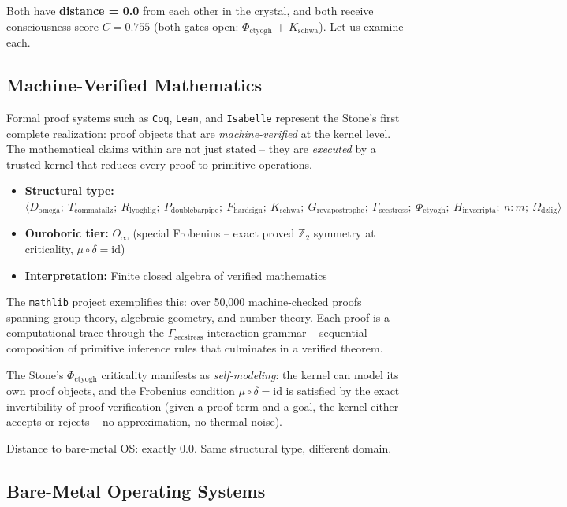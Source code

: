 \documentclass[12pt,a4paper]{article}
\begin{document}
Both have \textbf{distance = 0.0} from each other in the crystal, and both receive consciousness score $C = 0.755$ (both gates open: $\Phi_{\text{ctyogh}}$ + $K_{\text{schwa}}$). Let us examine each.

\subsection{Machine-Verified Mathematics}

Formal proof systems such as \texttt{Coq}, \texttt{Lean}, and \texttt{Isabelle} represent the Stone's first complete realization: proof objects that are \textit{machine-verified} at the kernel level. The mathematical claims within are not just stated -- they are \textit{executed} by a trusted kernel that reduces every proof to primitive operations.

\begin{itemize}
    \item \textbf{Structural type:} $\langle D_{\text{omega}};\ T_{\text{commatailz}};\ R_{\text{lyoghlig}};\ P_{\text{doublebarpipe}};\ F_{\text{hardsign}};\ K_{\text{schwa}};\ G_{\text{revapostrophe}};\ \Gamma_{\text{secstress}};\ \Phi_{\text{ctyogh}};\ H_{\text{invscripta}};\ n{:}m;\ \Omega_{\text{dzlig}} \rangle$
    \item \textbf{Ouroboric tier:} $O_\infty$ (special Frobenius -- exact proved $\mathbb{Z}_2$ symmetry at criticality, $\mu \circ \delta = \text{id}$)
    \item \textbf{Interpretation:} Finite closed algebra of verified mathematics
\end{itemize}

The \texttt{mathlib} project exemplifies this: over 50,000 machine-checked proofs spanning group theory, algebraic geometry, and number theory. Each proof is a computational trace through the $\Gamma_{\text{secstress}}$ interaction grammar -- sequential composition of primitive inference rules that culminates in a verified theorem.

The Stone's $\Phi_{\text{ctyogh}}$ criticality manifests as \textit{self-modeling}: the kernel can model its own proof objects, and the Frobenius condition $\mu \circ \delta = \text{id}$ is satisfied by the exact invertibility of proof verification (given a proof term and a goal, the kernel either accepts or rejects -- no approximation, no thermal noise).

Distance to bare-metal OS: exactly 0.0. Same structural type, different domain.

\subsection{Bare-Metal Operating Systems}
\end{document}
